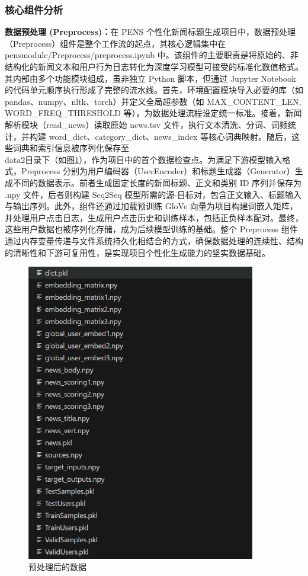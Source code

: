 \documentclass[10pt,a4paper]{article}
\begin{document}
\subsubsection{核心组件分析}
\textbf{数据预处理 (Preprocess)：}在 PENS 个性化新闻标题生成项目中，数据预处理（Preprocess）组件是整个工作流的起点，其核心逻辑集中在 pensmodule/Preprocess/preprocess.ipynb 中。该组件的主要职责是将原始的、非结构化的新闻文本和用户行为日志转化为深度学习模型可接受的标准化数值格式。其内部由多个功能模块组成，虽非独立 Python 脚本，但通过 Jupyter Notebook 的代码单元顺序执行形成了完整的流水线。首先，环境配置模块导入必要的库（如 pandas、numpy、nltk、torch）并定义全局超参数（如 MAX\_CONTENT\_LEN, WORD\_FREQ\_THRESHOLD 等），为数据处理流程设定统一标准。接着，新闻解析模块（read\_news）读取原始 news.tsv 文件，执行文本清洗、分词、词频统计，并构建 word\_dict、category\_dict、news\_index 等核心词典映射。随后，这些词典和索引信息被序列化保存至\\data2目录下（如图\ref{fig:processed_data}），作为项目中的首个数据检查点。为满足下游模型输入格式，Preprocess 分别为用户编码器（UserEncoder）和标题生成器（Generator）生成不同的数据表示。前者生成固定长度的新闻标题、正文和类别 ID 序列并保存为 .npy 文件，后者则构建 Seq2Seq 模型所需的源-目标对，包含正文输入、标题输入与输出序列。此外，组件还通过加载预训练 GloVe 向量为项目构建词嵌入矩阵，并处理用户点击日志，生成用户点击历史和训练样本，包括正负样本配对。最终，这些用户数据也被序列化存储，成为后续模型训练的基础。整个 Preprocess 组件通过内存变量传递与文件系统持久化相结合的方式，确保数据处理的连续性、结构的清晰性和下游可复用性，是实现项目个性化生成能力的坚实数据基础。

\begin{figure}[H]
  \centering
  \includegraphics[width=10cm]{fig/processed_data.png}
  \caption{预处理后的数据}\label{fig:processed_data}
\end{figure}
\end{document}
